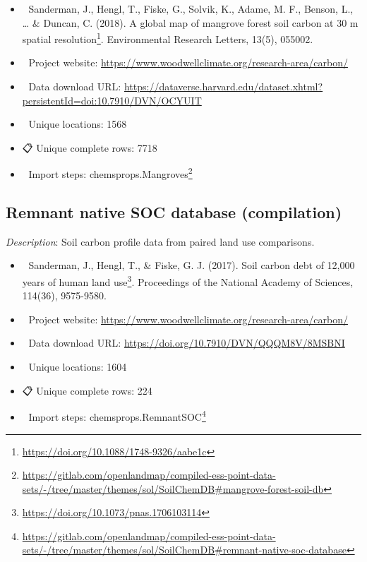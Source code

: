 \documentclass[
  graybox,natbib,nospthms]{svmono}
\providecommand{\tightlist}{%
  \setlength{\itemsep}{0pt}\setlength{\parskip}{0pt}}
\providecommand{\tightlist}{\setlength{\itemsep}{0pt}\setlength{\parskip}{0pt}}
\renewcommand{\href}[2]{#2 (\url{#1})}
\renewcommand{\href}[2]{#2\footnote{\url{#1}}}
\begin{document}
\begin{itemize}
\tightlist
\item
  📕 Sanderman, J., Hengl, T., Fiske, G., Solvik, K., Adame, M. F., Benson, L., \ldots{} \& Duncan, C. (2018). \href{https://doi.org/10.1088/1748-9326/aabe1c}{A global map of mangrove forest soil carbon at 30 m spatial resolution}. Environmental Research Letters, 13(5), 055002.\\
\item
  🔗 Project website: \url{https://www.woodwellclimate.org/research-area/carbon/}\\
\item
  📂 Data download URL: \url{https://dataverse.harvard.edu/dataset.xhtml?persistentId=doi:10.7910/DVN/OCYUIT}\\
\item
  📍 Unique locations: 1568\\
\item
  📋 Unique complete rows: 7718\\
\item
  📝 Import steps: \href{https://gitlab.com/openlandmap/compiled-ess-point-data-sets/-/tree/master/themes/sol/SoilChemDB\#mangrove-forest-soil-db}{chemsprops.Mangroves}
\end{itemize}

\hypertarget{remnant-native-soc-database-compilation}{%
\subsection{Remnant native SOC database (compilation)}\label{remnant-native-soc-database-compilation}}

\emph{Description}: Soil carbon profile data from paired land use comparisons.

\begin{itemize}
\tightlist
\item
  📕 Sanderman, J., Hengl, T., \& Fiske, G. J. (2017). \href{https://doi.org/10.1073/pnas.1706103114}{Soil carbon debt of 12,000 years of human land use}. Proceedings of the National Academy of Sciences, 114(36), 9575-9580.\\
\item
  🔗 Project website: \url{https://www.woodwellclimate.org/research-area/carbon/}\\
\item
  📂 Data download URL: \url{https://doi.org/10.7910/DVN/QQQM8V/8MSBNI}\\
\item
  📍 Unique locations: 1604\\
\item
  📋 Unique complete rows: 224\\
\item
  📝 Import steps: \href{https://gitlab.com/openlandmap/compiled-ess-point-data-sets/-/tree/master/themes/sol/SoilChemDB\#remnant-native-soc-database}{chemsprops.RemnantSOC}
\end{itemize}
\end{document}

